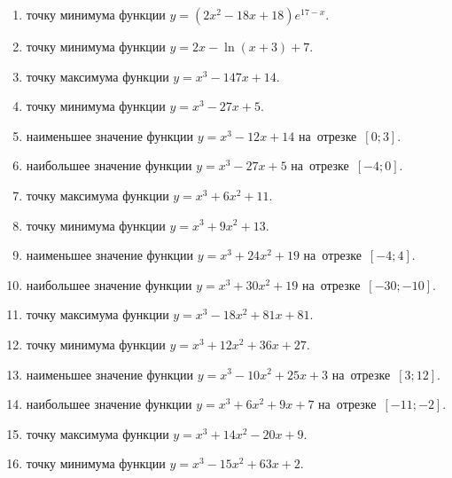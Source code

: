 \documentclass[a4paper,10pt]{article}
\begin{document}
\begin{enumerate}
\item {} точку минимума функции $y=\left(2x^2-18x+18\right){{e}^{17-x}}$.

\item {} точку минимума функции $y=2x-\ln \left(x+3\right)+7$.







\item {} точку максимума функции $y=x^3 -147x +14$.

\item {} точку минимума функции $y=x^3 -27x+5$.

\item {} наименьшее значение функции $y=x^3 -12x+14$ на~отрезке~$\left[0;3\right]$.

\item {} наибольшее значение функции $y=x^3 -27x+5$ на~отрезке~$\left[-4;0\right]$.

\item {} точку максимума функции $y=x^3 +6x^2+11$.

\item {} точку минимума функции $y=x^3 +9x^2+13$.

\item {} наименьшее значение функции $y=x^3 +24x^2+19$ на~отрезке~$\left[-4;4\right]$.

\item {} наибольшее значение функции $y=x^3 +30x^2+19$ на~отрезке~$\left[-30;-10\right]$.

\item {} точку максимума функции $y=x^3 -18x^2+81x+81$.

\item {} точку минимума функции $y=x^3 +12x^2+36x+27$.

\item {} наименьшее значение функции $y=x^3 -10x^2+25x+3$ на~отрезке~$\left[3;12\right]$.

\item {} наибольшее значение функции $y=x^3 +6x^2+9x+7$ на~отрезке~$\left[-11;-2\right]$.

\item {} точку максимума функции $y=x^3 +14x^2-20x+9$.

\item {} точку минимума функции $y=x^3 -15x^2+63x+2$.


\end{enumerate}
\end{document}
